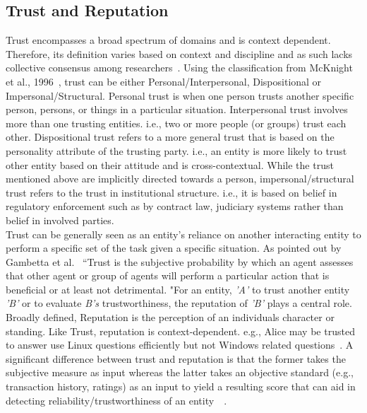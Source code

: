 \subsection{Trust and Reputation}
Trust encompasses a broad spectrum of domains and is context dependent.
Therefore, its definition varies based on context and discipline and as such
lacks collective consensus among researchers~\cite{mcknight1996meanings}.
Using the classification from McKnight et al., 1996~\cite{mcknight2001trust},
trust can be either Personal/Interpersonal, Dispositional or
Impersonal/Structural.  Personal trust is when one person trusts another
specific person, persons, or things in a particular situation. Interpersonal
trust involves more than one trusting entities. i.e., two or more people (or
groups) trust each other.  Dispositional trust refers to a more general trust
that is based on the personality attribute of the trusting party. i.e., an
entity is more likely to trust other entity based on their attitude and is
cross-contextual. While the trust mentioned above are implicitly directed
towards a person, impersonal/structural trust refers to the trust in
institutional structure.  i.e., it is based on belief in regulatory enforcement
such as by contract law, judiciary systems rather than belief in involved
parties.\\

Trust can be generally seen as an entity's reliance on another interacting
entity to perform a specific set of the task given a specific situation.  As
pointed out by Gambetta et al.~\cite{gambetta2000can} ``Trust is the subjective
probability by which an agent assesses that other agent or group of agents will
perform a particular action that is beneficial or at least not detrimental.
"For an entity, \textit{'A'} to trust another entity \textit{'B'} or to
evaluate \textit{B's} trustworthiness, the reputation of \textit{'B'} plays a
central role. Broadly defined, Reputation is the perception of an individuals
character or standing. Like Trust, reputation is context-dependent.  e.g.,
Alice may be trusted to answer use Linux questions efficiently but not Windows
related questions~\cite{zacharia2000collaborative}. A significant difference
between trust and reputation is that the former takes the subjective measure as
input whereas the latter takes an objective standard (e.g., transaction
history, ratings) as an input to yield a resulting score that can aid in
detecting reliability/trustworthiness of an
entity~\cite{Sabater2005}~\cite{castelfranchi2000trust}. \\

